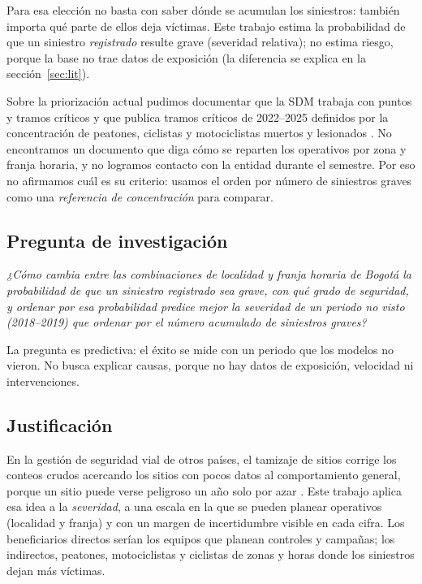 \documentclass[10pt,twocolumn]{article}
\begin{document}
Para esa elección no basta con saber dónde se acumulan los siniestros: también importa qué parte de ellos deja víctimas. Este trabajo estima la probabilidad de que un siniestro \emph{registrado} resulte grave (severidad relativa); no estima riesgo, porque la base no trae datos de exposición (la diferencia se explica en la sección~\ref{sec:lit}).

Sobre la priorización actual pudimos documentar que la SDM trabaja con puntos y tramos críticos \citep{sdm2020ficha} y que publica tramos críticos de 2022--2025 definidos por la concentración de peatones, ciclistas y motociclistas muertos y lesionados \citep{sdm2026tramos}. No encontramos un documento que diga cómo se reparten los operativos por zona y franja horaria, y no logramos contacto con la entidad durante el semestre. Por eso no afirmamos cuál es su criterio: usamos el orden por número de siniestros graves como una \emph{referencia de concentración} para comparar.

\subsection{Pregunta de investigación}
\emph{¿Cómo cambia entre las combinaciones de localidad y franja horaria de Bogotá la probabilidad de que un siniestro registrado sea grave, con qué grado de seguridad, y ordenar por esa probabilidad predice mejor la severidad de un periodo no visto (2018--2019) que ordenar por el número acumulado de siniestros graves?}

La pregunta es predictiva: el éxito se mide con un periodo que los modelos no vieron. No busca explicar causas, porque no hay datos de exposición, velocidad ni intervenciones.

\subsection{Justificación}
En la gestión de seguridad vial de otros países, el tamizaje de sitios corrige los conteos crudos acercando los sitios con pocos datos al comportamiento general, porque un sitio puede verse peligroso un año solo por azar \citep{fhwa2014hsm,hauer2002screening}. Este trabajo aplica esa idea a la \emph{severidad}, a una escala en la que se pueden planear operativos (localidad y franja) y con un margen de incertidumbre visible en cada cifra. Los beneficiarios directos serían los equipos que planean controles y campañas; los indirectos, peatones, motociclistas y ciclistas de zonas y horas donde los siniestros dejan más víctimas.
\end{document}
